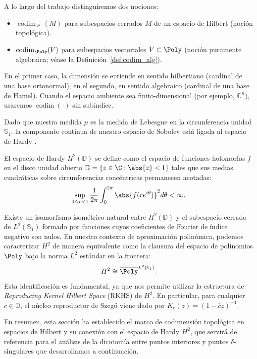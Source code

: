 \begin{rmk}\label{rem:convencion_codim}
	A lo largo del trabajo distinguiremos dos nociones:
	\begin{itemize}
		\item $\operatorname{codim}_{\mathcal{H}}(M)$ para subespacios cerrados $M$ de un espacio de Hilbert (noción topológica).
		\item $\operatorname{codim}_{\Poly}(V)$ para subespacios vectoriales $V\subset \Poly$ (noción puramente algebraica; véase la Definición~\ref{def:codim_alg}).
	\end{itemize}
	En el primer caso, la dimensión se entiende en sentido hilbertiano (cardinal de una base ortonormal); en el segundo, en sentido algebraico (cardinal de una base de Hamel).
	Cuando el espacio ambiente sea finito-dimensional (por ejemplo, $\mathbb{C}^n$), usaremos $\operatorname{codim}(\cdot)$ sin subíndice.
\end{rmk}

Dado que nuestra medida $\mu$ es la medida de Lebesgue en la circunferencia unidad $\mathbb{S}_1$, la componente continua de nuestro espacio de Sobolev está ligada al espacio de Hardy \cite{duren1970theory}.

\begin{defn}
	El espacio de Hardy $H^2(\mathbb{D})$ se define como el espacio de funciones holomorfas $f$ en el disco unidad abierto $\mathbb{D} = \{z \in \C : \abs{z} < 1\}$ tales que sus medias cuadráticas sobre circunferencias concéntricas permanecen acotadas:
	$$ \sup_{0 \le r < 1} \frac{1}{2\pi} \int_{0}^{2\pi} \abs{f(re^{i\theta})}^2 d\theta < \infty. $$
\end{defn}

Existe un isomorfismo isométrico natural entre $H^2(\mathbb{D})$ y el subespacio cerrado de $L^2(\mathbb{S}_1)$ formado por funciones cuyos coeficientes de Fourier de índice negativo son nulos. En nuestro contexto de aproximación polinómica, podemos caracterizar $H^2$ de manera equivalente como la clausura del espacio de polinomios $\Poly$ bajo la norma $L^2$ estándar en la frontera:
$$ H^2 \cong \overline{\Poly}^{L^2(\mathbb{S}_1)}. $$
Esta identificación es fundamental, ya que nos permite utilizar la estructura de \textit{Reproducing Kernel Hilbert Space} (RKHS) de $H^2$. En particular, para cualquier $c \in \mathbb{D}$, el núcleo reproductor de Szegő viene dado por $K_c(z) = (1-\bar{c}z)^{-1}$.

En resumen, esta sección ha establecido el marco de codimensión topológica en espacios de Hilbert y su conexión con el espacio de Hardy $H^2$, que servirá de referencia para el análisis de la dicotomía entre puntos interiores y puntos $\delta$-singulares que desarrollamos a continuación.

